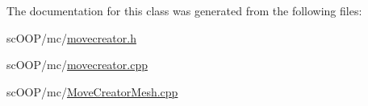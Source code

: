 The documentation for this class was generated from the following files\+:\begin{DoxyCompactItemize}
\item 
sc\+O\+O\+P/mc/\hyperlink{movecreator_8h}{movecreator.\+h}\item 
sc\+O\+O\+P/mc/\hyperlink{movecreator_8cpp}{movecreator.\+cpp}\item 
sc\+O\+O\+P/mc/\hyperlink{_move_creator_mesh_8cpp}{Move\+Creator\+Mesh.\+cpp}\end{DoxyCompactItemize}
